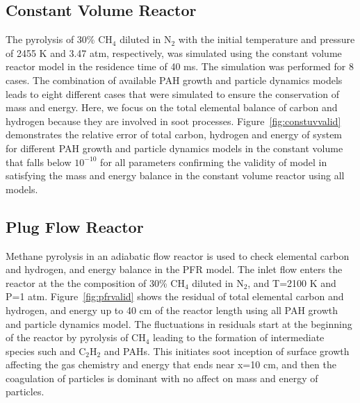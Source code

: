 \subsection{Constant Volume Reactor}
The pyrolysis of 30\% $\mathrm{CH_4}$ diluted in $\mathrm{N_2}$ with the initial temperature and pressure of 2455 K and 3.47 atm, respectively, was simulated using the constant volume reactor model in the residence time of 40 ms. The simulation was performed for 8 cases. The combination of available PAH growth and particle dynamics models leads to eight different cases that were simulated to ensure the conservation of mass and energy. Here, we focus on the total elemental balance of carbon and hydrogen because they are involved in soot processes. %
Figure~\ref{fig:constuvvalid} demonstrates the relative error of total carbon, hydrogen and energy of system for different PAH growth and particle dynamics models in the constant volume that falls below $\mathrm{10^{-10}}$ for all parameters confirming the validity of model in satisfying the mass and energy balance in the constant volume reactor using all models. 

\subsection{Plug Flow Reactor}
Methane pyrolysis in an adiabatic flow reactor is used to check elemental carbon and hydrogen, and energy balance in the PFR model. The inlet flow enters the reactor at the the composition of 30\% $\mathrm{CH_4}$ diluted in $\mathrm{N_2}$, and T=2100 K and P=1 atm. Figure~\ref{fig:pfrvalid} shows the residual of total elemental carbon and hydrogen, and energy up to 40 cm of the reactor length using all PAH growth and particle dynamics model. The fluctuations in residuals start at the beginning of the reactor by pyrolysis of $\mathrm{CH_4}$ leading to the formation of intermediate species such and $\mathrm{C_2H_2}$ and PAHs. This initiates soot inception of surface growth affecting the gas chemistry and energy that ends near x=10 cm, and then the coagulation of particles is dominant with no affect on mass and energy of particles.


